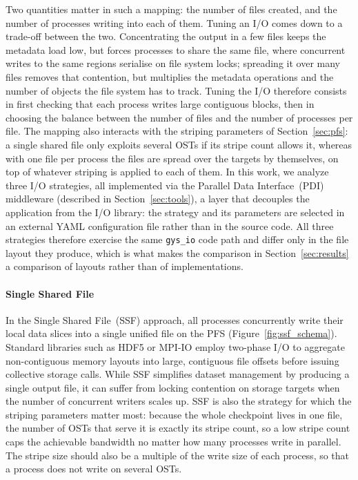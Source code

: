 Two quantities matter in such a mapping: the number of files created, and the number
of processes writing into each of them. Tuning an I/O comes down to a trade-off
between the two. Concentrating the output in a few files keeps the metadata load low,
but forces processes to share the same file, where concurrent writes to the same regions
serialise on file system locks; spreading it over many files removes that contention,
but multiplies the metadata operations and the number of objects the file system has
to track. Tuning the I/O therefore consists in first checking that each process
writes large contiguous blocks, then in choosing the balance between the number of
files and the number of processes per file. The mapping also interacts with the striping parameters of
Section~\ref{sec:pfs}: a single shared file only exploits several OSTs if its stripe
count allows it, whereas with one file per process the files are spread
over the targets by themselves, on top of whatever striping is applied to each of them. In this work,
we analyze three I/O strategies, all implemented via the Parallel Data
Interface~(PDI) middleware (described in Section~\ref{sec:tools}), a layer that
decouples the application from the I/O library: the strategy and its parameters
are selected in an external YAML configuration file rather than in the source code. All
three strategies therefore exercise the same \texttt{gys\_io} code path and differ
only in the file layout they produce, which is what makes the comparison in
Section~\ref{sec:results} a comparison of layouts rather than of implementations.

\paragraph{Single Shared File}
\label{sec:ssf}
In the Single Shared File~(SSF) approach, all processes concurrently write
their local data slices into a single unified file on the PFS
(Figure~\ref{fig:ssf_schema}). Standard libraries such as HDF5 or MPI-IO employ
two-phase I/O to aggregate non-contiguous memory layouts into large, contiguous
file offsets before issuing collective storage calls. While SSF simplifies dataset
management by producing a single output file, it can suffer from locking contention
on storage targets when the number of concurrent writers scales up.
SSF is also the strategy for which the striping parameters
matter most: because the whole checkpoint lives in one file, the number of OSTs that
serve it is exactly its stripe count, so a low stripe count caps the
achievable bandwidth no matter how many processes write in parallel. The stripe size
should also be a multiple of the write size of each process, so that a process does not
write on several OSTs.

